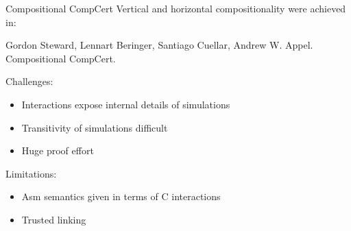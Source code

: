 \documentclass[aspectratio=169,mathserif]{beamer}
\begin{document}
\begin{frame}{Compositional CompCert} %
  Vertical and horizontal compositionality were achieved in:
  \begin{thebibliography}{0}
      Gordon Steward, Lennart Beringer, Santiago Cuellar, Andrew W. Appel.
      \newblock Compositional CompCert.
  \end{thebibliography}

  \vspace{1em}
  Challenges:
  \begin{itemize}
    \item Interactions expose internal details of simulations
    \item Transitivity of simulations difficult
    \item Huge proof effort
  \end{itemize}

  \vspace{1em}
  Limitations:
  \begin{itemize}
    \item Asm semantics given in terms of C interactions
    \item Trusted linking
  \end{itemize}
\end{frame}
\end{document}
